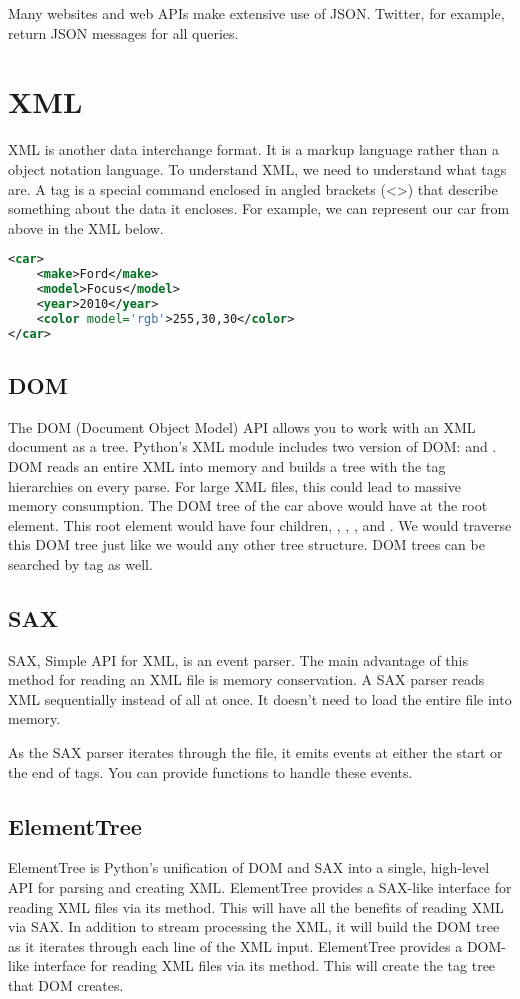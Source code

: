 Many websites and web APIs make extensive use of JSON.
Twitter, for example, return JSON messages for all queries.

\section*{XML}
XML is another data interchange format.  It is a markup language rather than a object notation language.
To understand XML, we need to understand what tags are.
A tag is a special command enclosed in angled brackets (<>) that describe something about the data it encloses.
For example, we can represent our car from above in the XML below.
\begin{lstlisting}[language=XML]
<car>
	<make>Ford</make>
	<model>Focus</model>
	<year>2010</year>
	<color model='rgb'>255,30,30</color>
</car>
\end{lstlisting}

\subsection*{DOM}
The DOM (Document Object Model) API allows you to work with an XML document as a tree.
Python's XML module includes two version of DOM:  and .
DOM reads an entire XML into memory and builds a tree with the tag hierarchies on every parse.
For large XML files, this could lead to massive memory consumption.
The DOM tree of the car above would have  at the root element.
This root element would have four children, , , , and .
We would traverse this DOM tree just like we would any other tree structure.
DOM trees can be searched by tag as well.

\subsection*{SAX}
SAX, Simple API for XML, is an event parser.
The main advantage of this method for reading an XML file is memory conservation.
A SAX parser reads XML sequentially instead of all at once.
It doesn't need to load the entire file into memory.

As the SAX parser iterates through the file, it emits events at either the start or the end of tags.
You can provide functions to handle these events.


\subsection*{ElementTree}
ElementTree is Python's unification of DOM and SAX into a single, high-level API for parsing and creating XML.
ElementTree provides a SAX-like interface for reading XML files via its  method.
This will have all the benefits of reading XML via SAX.
In addition to stream processing the XML, it will build the DOM tree as it iterates through each line of the XML input.
ElementTree provides a DOM-like interface for reading XML files via its  method.
This will create the tag tree that DOM creates.





